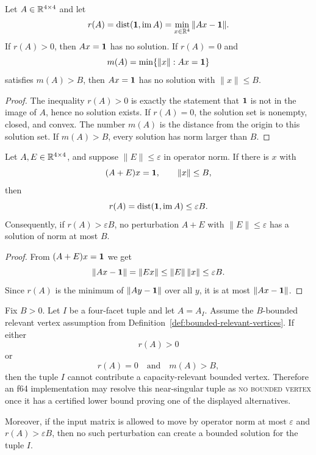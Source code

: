 \begin{unverified}
\begin{lemma}
\label{lem:singular-system-bounded-exclusion}
Let $A\in\mathbb{R}^{4\times4}$ and let
\[
  r(A)=\operatorname{dist}(\mathbf{1},\operatorname{im} A)
       =\min_{x\in\mathbb{R}^4}\|Ax-\mathbf{1}\|.
\]
If $r(A)>0$, then $Ax=\mathbf{1}$ has no solution.  If $r(A)=0$ and
\[
  m(A)=\min\{\|x\|:Ax=\mathbf{1}\}
\]
satisfies $m(A)>B$, then $Ax=\mathbf{1}$ has no solution with $\|x\|\le B$.
\end{lemma}
\end{unverified}

\begin{proof}
The inequality $r(A)>0$ is exactly the statement that $\mathbf{1}$ is not in the image
of $A$, hence no solution exists.  If $r(A)=0$, the solution set is nonempty,
closed, and convex.  The number $m(A)$ is the distance from the origin to this
solution set.  If $m(A)>B$, every solution has norm larger than $B$.
\end{proof}

\begin{unverified}
\begin{lemma}\label{lem:perturbed-bounded-exclusion}
Let $A,E\in\mathbb{R}^{4\times4}$, and suppose $\|E\|\le\varepsilon$ in operator norm.
If there is $x$ with
\[
  (A+E)x=\mathbf{1},\qquad \|x\|\le B,
\]
then
\[
  r(A)=\operatorname{dist}(\mathbf{1},\operatorname{im} A)\le \varepsilon B.
\]
Consequently, if $r(A)>\varepsilon B$, no perturbation $A+E$ with
$\|E\|\le\varepsilon$ has a solution of norm at most $B$.
\end{lemma}
\end{unverified}

\begin{proof}
From $(A+E)x=\mathbf{1}$ we get
\[
  \|Ax-\mathbf{1}\|=\|Ex\|\le \|E\|\,\|x\|\le \varepsilon B.
\]
Since $r(A)$ is the minimum of $\|Ay-\mathbf{1}\|$ over all $y$, it is at most
$\|Ax-\mathbf{1}\|$.
\end{proof}

\begin{unverified}
\begin{proposition}
\label{prop:near-singular-no-bounded-vertex-certificate}
Fix $B>0$.  Let $I$ be a four-facet tuple and let $A=A_I$.
Assume the $B$-bounded relevant vertex assumption from
Definition~\ref{def:bounded-relevant-vertices}.  If either
\[
  r(A)>0
\]
or
\[
  r(A)=0\quad\text{and}\quad m(A)>B,
\]
then the tuple $I$ cannot contribute a capacity-relevant bounded vertex.
Therefore an f64 implementation may resolve this near-singular tuple as
\textsc{no bounded vertex} once it has a certified lower bound proving one of
the displayed alternatives.

Moreover, if the input matrix is allowed to move by operator norm at most
$\varepsilon$ and $r(A)>\varepsilon B$, then no such perturbation can create a
bounded solution for the tuple $I$.
\end{proposition}
\end{unverified}

